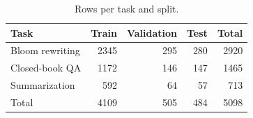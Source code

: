 \begin{table}[t]
\centering
\caption{Rows per task and split.}
\label{tab:t1_dataset_splits}
\begin{tabular}{lrrrr}
\toprule
Task & Train & Validation & Test & Total \\
\midrule
Bloom rewriting & 2345 & 295 & 280 & 2920 \\
Closed-book QA & 1172 & 146 & 147 & 1465 \\
Summarization & 592 & 64 & 57 & 713 \\
Total & 4109 & 505 & 484 & 5098 \\
\bottomrule
\end{tabular}
\end{table}
